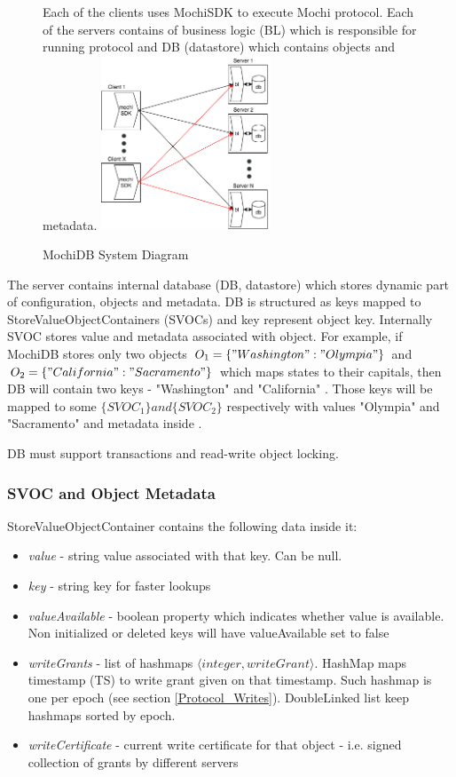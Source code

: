 \documentclass[letterpaper,twocolumn,10pt]{article}
\begin{document}
\begin{figure}
\caption{MochiDB System Diagram}
\small
Each of the clients uses MochiSDK to execute Mochi protocol. Each of the servers contains of business logic (BL) which is responsible for running protocol and DB (datastore) which contains objects and metadata.
\centering
\includegraphics[width=0.45\textwidth]{System_View.png}
\label{fig:system_view}
\end{figure}

The server contains internal database (DB, datastore) which stores  dynamic part of configuration, objects and metadata. DB is structured as keys mapped to StoreValueObjectContainers (SVOCs) and key represent object key. 
Internally SVOC stores value and metadata associated with object. For example, if MochiDB stores only two objects \(O_{1} = \{ "Washington":"Olympia" \} \) and \(O_{2} = \{ "California" : "Sacramento"\} \) which maps states to their capitals, then DB will contain two keys - {"Washington" and "California" }. Those keys will be mapped to some \( \{ SVOC_{1} \} and \{ SVOC_{2} \} \) respectively with values "Olympia" and "Sacramento" and metadata inside .

DB must support transactions and read-write object locking.

\subsubsection{SVOC and Object Metadata}
StoreValueObjectContainer contains the following data inside it:
\begin{itemize}
  \item \textit{value} - string value associated with that key. Can be null.
  \item  \textit{key} - string key for faster lookups
  \item  \textit{valueAvailable} - boolean property which indicates whether value is available. Non initialized or deleted keys will have valueAvailable set to false
  \item \textit{writeGrants} - list of hashmaps $\langle integer, writeGrant \rangle$. HashMap maps timestamp (TS) to write grant given on that timestamp. Such hashmap is one per epoch (see section \ref{Protocol_Writes}). DoubleLinked list keep hashmaps sorted by epoch.
  \item \textit{writeCertificate} - current write certificate for that object - i.e. signed collection of grants by different servers
\end{itemize}
\end{document}
